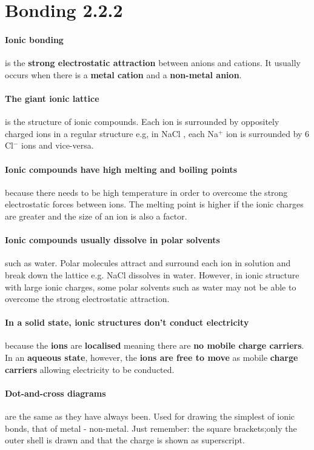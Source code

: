     \section{Bonding 2.2.2}
    \paragraph{Ionic bonding} is the \textbf{strong electrostatic attraction} between anions and cations.
    It usually occurs when there is a \textbf{metal cation} and a \textbf{non-metal anion}.
    \paragraph{The giant ionic lattice} is the structure of ionic compounds. 
    Each ion is surrounded by oppositely charged ions in a regular structure e.g, in NaCl , each Na$^+$ ion is surrounded by 6 Cl$^-$ ions and vice-versa.
    \paragraph{Ionic compounds have high melting and boiling points} because there needs to be high temperature in order to overcome the strong electrostatic forces between ions.
    The melting point is higher if the ionic charges are greater and the size of an ion is also a factor.
    \paragraph{Ionic compounds usually dissolve in polar solvents}such as water. Polar molecules attract and surround each ion in solution and break down the lattice e.g. NaCl dissolves in water.
    However, in ionic structure with large ionic charges, some polar solvents such as water may not be able to overcome the strong electrostatic attraction.
    \paragraph{ In a solid state, ionic structures don't conduct electricity} because the \textbf{ions} are \textbf{localised} meaning there are \textbf{no mobile charge carriers}.
    In an \textbf{aqueous state}, however, the \textbf{ions are free to move} as mobile \textbf{charge carriers} allowing electricity to be conducted.
   \paragraph{Dot-and-cross diagrams} are the same as they have always been.
	Used for drawing the simplest of ionic bonds, that of metal - non-metal.
	Just remember: the square brackets;only the outer shell is drawn and that the charge is shown as superscript.
  \pagebreak
